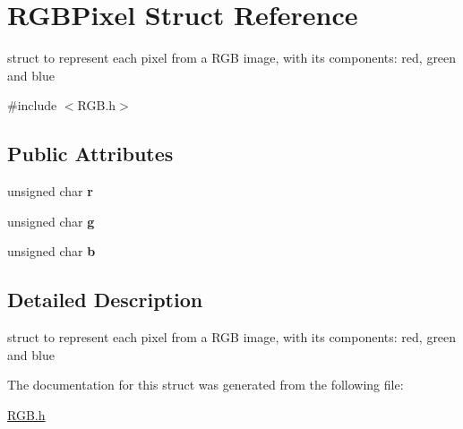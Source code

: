 \hypertarget{structRGBPixel}{}\section{R\+G\+B\+Pixel Struct Reference}
\label{structRGBPixel}


struct to represent each pixel from a R\+GB image, with its components\+: red, green and blue  




{\ttfamily \#include $<$R\+G\+B.\+h$>$}

\subsection*{Public Attributes}
\begin{DoxyCompactItemize}
\item 
\mbox{\label{structRGBPixel_a65cdf4f2f2af9454f5e486b77572b4fa}} 
unsigned char {\bfseries r}
\item 
\mbox{\label{structRGBPixel_a43f513b1963685e87e3382edba4b265b}} 
unsigned char {\bfseries g}
\item 
\mbox{\label{structRGBPixel_ae8806fbda3385a0ef4661d7bab15157a}} 
unsigned char {\bfseries b}
\end{DoxyCompactItemize}


\subsection{Detailed Description}
struct to represent each pixel from a R\+GB image, with its components\+: red, green and blue 

The documentation for this struct was generated from the following file\+:\begin{DoxyCompactItemize}
\item 
\hyperlink{RGB_8h}{R\+G\+B.\+h}\end{DoxyCompactItemize}
